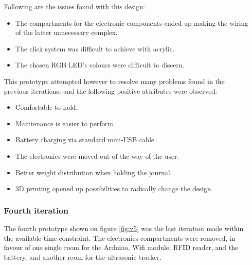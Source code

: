 Following are the issues found with this design:

\begin{itemize} \itemsep0em
  \item The compartments for the electronic components ended up making the wiring of the latter unnecessary complex.
  \item The click system was difficult to achieve with acrylic.
  \item The chosen RGB LED's colours were difficult to discern.
\end{itemize}

This prototype attempted however to resolve many problems found in the previous iterations, and the following positive attributes were observed:

\begin{itemize} \itemsep0em
  \item Comfortable to hold.
  \item Maintenance is easier to perform.
  \item Battery charging via standard mini-USB cable.
  \item The electronics were moved out of the way of the user.
  \item Better weight distribution when holding the journal.
  \item 3D printing opened up possibilities to radically change the design.
\end{itemize}




\subsubsection{Fourth iteration}

The fourth prototype shown on figure \ref{fig:v5} was the last iteration made within the available time constraint. The electronics compartments were removed, in favour of one single room for the Arduino, Wifi module, RFID reader, and the battery, and another room for the ultrasonic tracker. 

